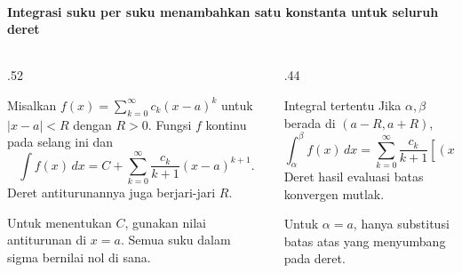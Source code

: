 \documentclass{../../kalkulus-ppt}
\begin{document}
\begin{frame}{\insertsection}
    \framesubtitle{Integrasi suku per suku menambahkan satu konstanta untuk seluruh deret}
    \begin{columns}[c,onlytextwidth]
        \begin{column}{.52\textwidth}
            \begin{teorema}
                Misalkan $f(x)=\sum_{k=0}^\infty c_k(x-a)^k$
                untuk $|x-a|<R$ dengan $R>0$.
                Fungsi $f$ kontinu pada selang ini dan
                \[
                    \int f(x)\,dx=C+
                    \sum_{k=0}^\infty\frac{c_k}{k+1}(x-a)^{k+1}.
                \]
                Deret antiturunannya juga berjari-jari $R$.
            \end{teorema}
            Untuk menentukan $C$, gunakan nilai antiturunan
            di $x=a$. Semua suku dalam sigma bernilai nol di sana.
        \end{column}
        \begin{column}{.44\textwidth}
            \begin{block}{Integral tertentu}
                Jika $\alpha,\beta$ berada di $(a-R,a+R)$,
                \[
                    \int_\alpha^\beta f(x)\,dx
                     =\sum_{k=0}^\infty\frac{c_k}{k+1}
                       \left[(x-a)^{k+1}\right]_\alpha^\beta .
                \]
                Deret hasil evaluasi batas konvergen mutlak.
            \end{block}
            Untuk $\alpha=a$, hanya substitusi batas atas
            yang menyumbang pada deret.
        \end{column}
    \end{columns}
\end{frame}
\end{document}
